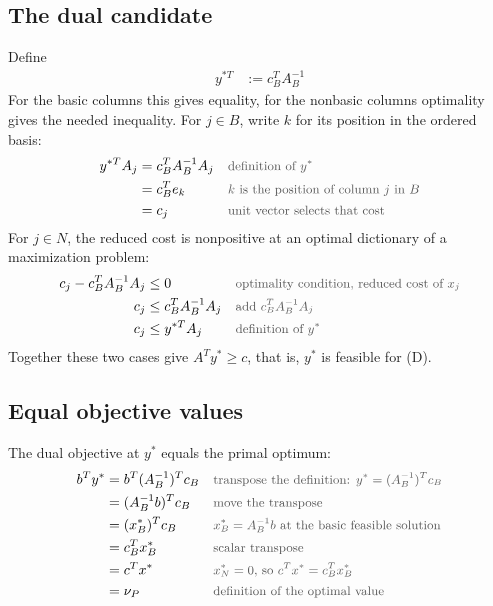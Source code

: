 \documentclass[a4paper,11pt]{article}
\newif\ifexplain
\newcommand{\teil}[1]{\subsection*{#1}}
\newcommand{\why}[1]{\text{\small\color{black!65}#1}}
\newcommand{\explain}[1]{\ifexplain\begin{erklbox}#1\end{erklbox}\fi}
\begin{document}
\teil{The dual candidate}
Define
\begin{align*}
y^{*T} &:= c_B^TA_B^{-1}
\end{align*}
For the basic columns this gives equality, for the nonbasic columns optimality gives the needed inequality. For $j\in B$, write $k$ for its position in the ordered basis:
\begin{align*}
y^{*T}A_j &= c_B^TA_B^{-1}A_j && \why{definition of $y^*$}\\
&= c_B^Te_k && \why{$k$ is the position of column $j$ in $B$}\\
&= c_j && \why{unit vector selects that cost}
\end{align*}
For $j\in N$, the reduced cost is nonpositive at an optimal dictionary of a maximization problem:
\begin{align*}
c_j - c_B^TA_B^{-1}A_j &\le 0 && \why{optimality condition, reduced cost of $x_j$}\\
c_j &\le c_B^TA_B^{-1}A_j && \why{add $c_B^TA_B^{-1}A_j$}\\
c_j &\le y^{*T}A_j && \why{definition of $y^*$}
\end{align*}
Together these two cases give $A^Ty^* \ge c$, that is, $y^*$ is feasible for (D).
\explain{Das ist der Kern: Die negativen reduzierten Kosten sind die Schlupfwerte der dualen Ungleichungen. Für eine Nichtbasisvariable gilt also $A_j^Ty^*-c_j=-\bar c_j\ge0$. Der Vektor $y^{*T}=c_B^TA_B^{-1}$ (die Simplex-Multiplikatoren) wird aus der optimalen Basis abgelesen und erfüllt $A^Ty^*\ge c$ komponentenweise: für Basisindizes mit Gleichheit, für Nichtbasisindizes wegen der Optimalität.}

\teil{Equal objective values}
The dual objective at $y^*$ equals the primal optimum:
\begin{align*}
b^Ty^* &= b^T(A_B^{-1})^Tc_B && \why{transpose the definition: $y^* = (A_B^{-1})^Tc_B$}\\
&= (A_B^{-1}b)^Tc_B && \why{move the transpose}\\
&= (x^*_B)^Tc_B && \why{$x^*_B = A_B^{-1}b$ at the basic feasible solution}\\
&= c_B^Tx^*_B && \why{scalar transpose}\\
&= c^Tx^* && \why{$x^*_N = 0$, so $c^Tx^* = c_B^Tx^*_B$}\\
&= \nu_P && \why{definition of the optimal value}
\end{align*}
\end{document}
